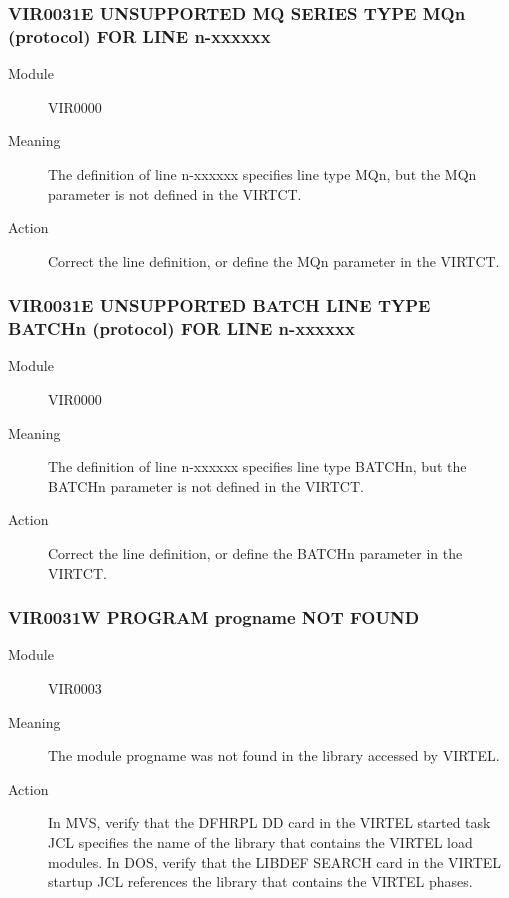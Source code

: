 \documentclass[letterpaper,10pt,english]{sphinxmanual}
\begin{document}
\subsubsection{VIR0031E UNSUPPORTED MQ SERIES TYPE MQn (protocol) FOR LINE n-xxxxxx}
\label{\detokenize{messages:vir0031e-unsupported-mq-series-type-mqn-protocol-for-line-n-xxxxxx}}\begin{description}
\item[{Module}] \leavevmode
VIR0000

\item[{Meaning}] \leavevmode
The definition of line n-xxxxxx specifies line type MQn, but the MQn parameter is not defined in the VIRTCT.

\item[{Action}] \leavevmode
Correct the line definition, or define the MQn parameter in the VIRTCT.

\end{description}


\subsubsection{VIR0031E UNSUPPORTED BATCH LINE TYPE BATCHn (protocol) FOR LINE n-xxxxxx}
\label{\detokenize{messages:vir0031e-unsupported-batch-line-type-batchn-protocol-for-line-n-xxxxxx}}\begin{description}
\item[{Module}] \leavevmode
VIR0000

\item[{Meaning}] \leavevmode
The definition of line n-xxxxxx specifies line type BATCHn, but the BATCHn parameter is not defined in the VIRTCT.

\item[{Action}] \leavevmode
Correct the line definition, or define the BATCHn parameter in the VIRTCT.

\end{description}


\subsubsection{VIR0031W PROGRAM progname NOT FOUND}
\label{\detokenize{messages:vir0031w-program-progname-not-found}}\begin{description}
\item[{Module}] \leavevmode
VIR0003

\item[{Meaning}] \leavevmode
The module progname was not found in the library accessed by VIRTEL.

\item[{Action}] \leavevmode
In MVS, verify that the DFHRPL DD card in the VIRTEL started task JCL specifies the name of the library that contains the VIRTEL load modules. In DOS, verify that the LIBDEF SEARCH card in the VIRTEL startup JCL references the library that contains the VIRTEL phases.

\end{description}
\end{document}
